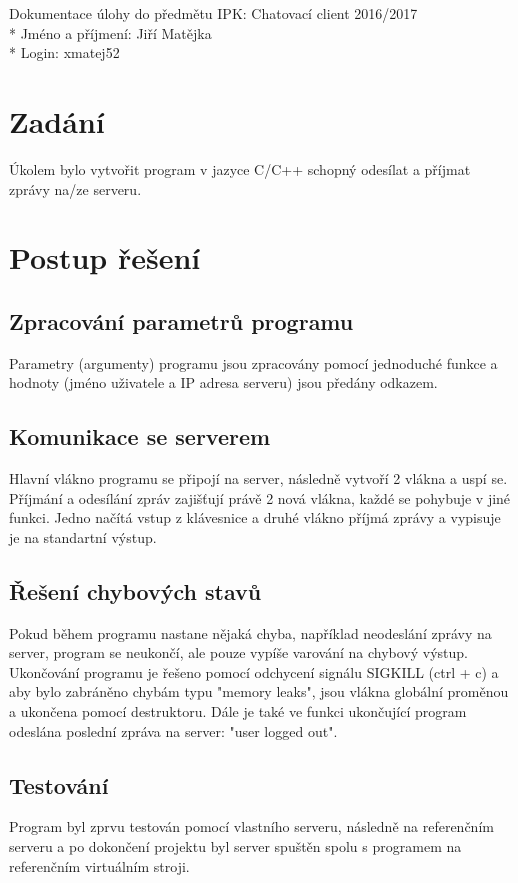 \documentclass[a4paper, 10pt]{article}
\begin{document}
    \noindent
    Dokumentace úlohy do předmětu IPK: Chatovací client 2016/2017 \\*
    Jméno a příjmení: Jiří Matějka \\*
    Login: xmatej52

    \section{Zadání}
        Úkolem bylo vytvořit program v jazyce C/C++ schopný odesílat a příjmat
        zprávy na/ze serveru.
    \section{Postup řešení}
        \subsection{Zpracování parametrů programu}
            Parametry (argumenty) programu jsou zpracovány pomocí jednoduché funkce
            a hodnoty (jméno uživatele a IP adresa serveru) jsou předány odkazem.
        \subsection{Komunikace se serverem}
            Hlavní vlákno programu se připojí na server, následně vytvoří 2 vlákna
            a uspí se. Příjmání a odesílání zpráv zajišťují právě 2 nová vlákna,
            každé se pohybuje v jiné funkci. Jedno načítá vstup z klávesnice
            a druhé vlákno příjmá zprávy a vypisuje je na standartní výstup.
        \subsection{Řešení chybových stavů}
            Pokud během programu nastane nějaká chyba, například neodeslání zprávy
            na server, program se neukončí, ale pouze vypíše varování na chybový
            výstup. Ukončování programu je řešeno pomocí odchycení signálu
            SIGKILL (ctrl + c) a aby bylo zabráněno chybám typu "memory leaks",
            jsou vlákna globální proměnou a ukončena pomocí destruktoru. Dále
            je také ve funkci ukončující program odeslána poslední zpráva na
            server: "user logged out".
        \subsection{Testování}
            Program byl zprvu testován pomocí vlastního serveru,
            následně na referenčním serveru a po dokončení projektu byl server
            spuštěn spolu s programem na referenčním virtuálním stroji.
\end{document}
